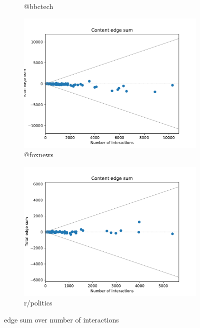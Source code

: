 \documentclass{beamer}
\begin{document}
\begin{frame}[c]
\begin{figure}
\begin{center}
\begin{subfigure}[b]{0.4\textwidth}
                \caption{@bbctech}
                \label{fig:out/bbctech200/edge-sum-n-interactions.pdf}
            \end{subfigure}
            \begin{subfigure}[b]{0.4\textwidth}
                \centering
                \includegraphics[width=\textwidth]{out/foxnews400/edge-sum-n-interactions.pdf}
                \caption{@foxnews}
                \label{fig:out/foxnews400/edge-sum-n-interactions.pdf}
            \end{subfigure}
            \begin{subfigure}[b]{0.4\textwidth}
                \centering
                \includegraphics[width=\textwidth]{out/politics200/edge-sum-n-interactions.pdf}
                \caption{r/politics}
                \label{fig:out/politics200/edge-sum-n-interactions.pdf}
            \end{subfigure}
        \end{center}
        \caption{edge sum over number of interactions}
    \end{figure}
\end{frame}
\end{document}

